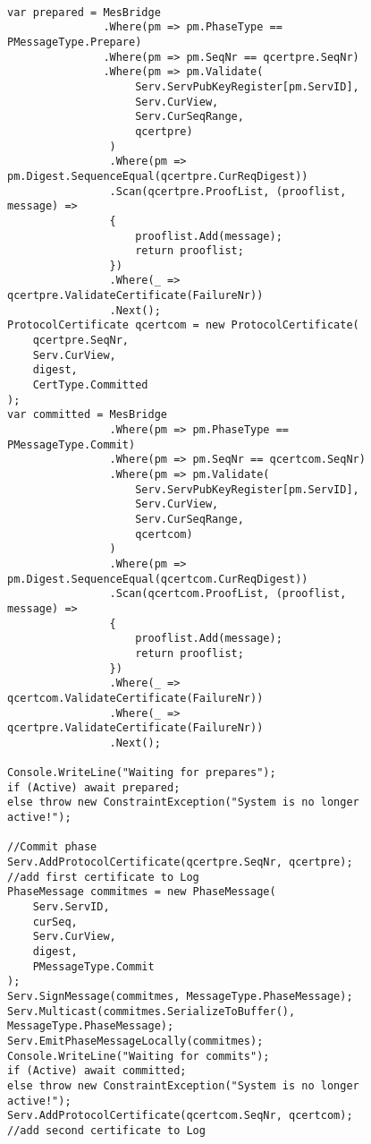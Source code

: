 \begin{figure}[H]
	\centering
	\begin{lstlisting}[label = code:PrepareAndCommit, caption= Prepare and Commit phase, captionpos = b, basicstyle=\scriptsize]
	
var prepared = MesBridge
               .Where(pm => pm.PhaseType == PMessageType.Prepare)
               .Where(pm => pm.SeqNr == qcertpre.SeqNr)
               .Where(pm => pm.Validate(
                    Serv.ServPubKeyRegister[pm.ServID], 
                    Serv.CurView, 
                    Serv.CurSeqRange, 
                    qcertpre)
                )
                .Where(pm => pm.Digest.SequenceEqual(qcertpre.CurReqDigest))
                .Scan(qcertpre.ProofList, (prooflist, message) =>
                {
                    prooflist.Add(message);
                    return prooflist;
                })
                .Where(_ => qcertpre.ValidateCertificate(FailureNr))
                .Next();
ProtocolCertificate qcertcom = new ProtocolCertificate(
    qcertpre.SeqNr, 
    Serv.CurView, 
    digest, 
    CertType.Committed
);   
var committed = MesBridge
                .Where(pm => pm.PhaseType == PMessageType.Commit)
                .Where(pm => pm.SeqNr == qcertcom.SeqNr)
                .Where(pm => pm.Validate(
                    Serv.ServPubKeyRegister[pm.ServID], 
                    Serv.CurView, 
                    Serv.CurSeqRange, 
                    qcertcom)
                )
                .Where(pm => pm.Digest.SequenceEqual(qcertcom.CurReqDigest))
                .Scan(qcertcom.ProofList, (prooflist, message) =>
                {
                    prooflist.Add(message);
                    return prooflist;
                })
                .Where(_ => qcertcom.ValidateCertificate(FailureNr))
                .Where(_ => qcertpre.ValidateCertificate(FailureNr))
                .Next();
                
Console.WriteLine("Waiting for prepares");
if (Active) await prepared;
else throw new ConstraintException("System is no longer active!");
                
//Commit phase
Serv.AddProtocolCertificate(qcertpre.SeqNr, qcertpre); //add first certificate to Log
PhaseMessage commitmes = new PhaseMessage(
    Serv.ServID, 
    curSeq, 
    Serv.CurView, 
   	digest, 
    PMessageType.Commit
);
Serv.SignMessage(commitmes, MessageType.PhaseMessage);
Serv.Multicast(commitmes.SerializeToBuffer(), MessageType.PhaseMessage);
Serv.EmitPhaseMessageLocally(commitmes);
Console.WriteLine("Waiting for commits");
if (Active) await committed;
else throw new ConstraintException("System is no longer active!");
Serv.AddProtocolCertificate(qcertcom.SeqNr, qcertcom); //add second certificate to Log
	\end{lstlisting}
\end{figure}

